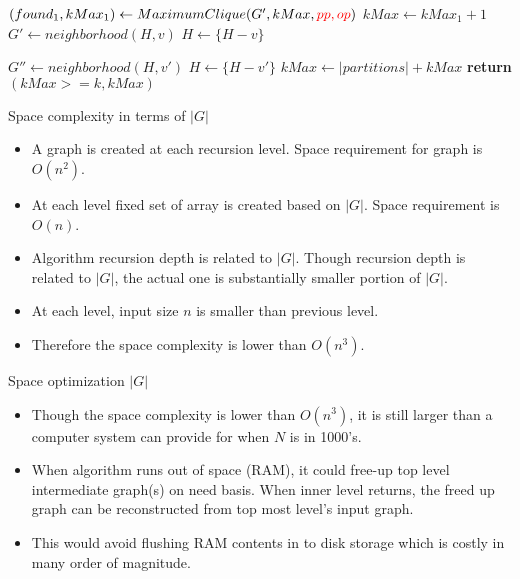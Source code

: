 \documentclass[landscape]{slides}
\begin{document}
\begin{algorithm}
	\begin{algorithmic}[1]
		\State $(found_1, kMax_1) \gets MaximumClique(G', kMax, {\color{red} pp, op})$
		\State $kMax \gets kMax_1 + 1$
		\EndIf
		\EndIf
		\EndIf
		\State
		\State $G' \gets neighborhood(H, v)$
		\State $H \gets \{H - v\}$
		
		\State $G'' \gets neighborhood(H, v')$
		\State $H \gets \{H - v'\}$
		\EndIf
		\EndFor
		\EndWhile
		\State $kMax \gets |partitions| + kMax$
		\State \textbf{return} $(kMax >= k, kMax)$
	\EndFunction
	\end{algorithmic}
\end{algorithm}

\clearpage


\begin{slide}
	\begin{center}
		Space complexity in terms of $|G|$
	\end{center}
	\begin{itemize}
		\setlength{\itemsep}{0pt}
		\setlength{\parskip}{20pt}
		\setlength{\parsep}{0pt}
		\item A graph is created at each recursion level. Space requirement for graph is $O(n^2)$. 
		\item At each level fixed set of array is created based on $|G|$. Space requirement is $O(n)$.
		\item Algorithm recursion depth is related to $|G|$. Though recursion depth is related to $|G|$, the actual one is substantially smaller portion of $|G|$.
		\item At each level, input size $n$ is smaller than previous level.
		\item Therefore the space complexity is lower than $O(n^3)$.
	\end{itemize}
\end{slide}


\begin{slide}
	\begin{center}
		Space optimization $|G|$
	\end{center}
	\begin{itemize}
		\setlength{\itemsep}{0pt}
		\setlength{\parskip}{20pt}
		\setlength{\parsep}{0pt}
		\item Though the space complexity is lower than $O(n^3)$, it is still larger than a computer system can provide for when $N$ is in 1000's.
		\item When algorithm runs out of space (RAM), it could free-up top level intermediate graph(s) on need basis. When inner level returns, the freed up graph can be reconstructed from top most level's input graph.
		\item This would avoid flushing RAM contents in to disk storage which is costly in many order of magnitude.
	\end{itemize}
\end{slide}
\end{document}
